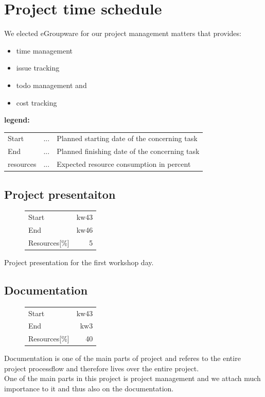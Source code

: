 \section{Project time schedule}

We elected eGroupware for our project management matters that provides:
\begin{itemize}
 \item time management
 \item issue tracking
 \item todo management and
 \item cost tracking
\end{itemize}

\textbf{legend:} \\
\begin{tabular}{lcl}
Start & ... & Planned starting date of the concerning task\\
End   & ... & Planned finishing date of the concerning task\\ 
resources & ... & Expected resource consumption in percent\\
\end{tabular}


\subsection{Project presentaiton}
\begin{figure}
\begin{tabular}[t]{|lr|}
\hline
Start & kw43\\
End & kw46\\
Resources[\%] & 5\\
\hline
\end{tabular}
\end{figure}
Project presentation for the first workshop day.\\

\subsection{Documentation}
\begin{figure}
\begin{tabular}[t]{|lr|}
\hline
Start & kw43\\
End & kw3\\
Resources[\%] & 40\\
\hline
\end{tabular}
\end{figure}
Documentation is one of the main parts of project and referes to the entire project 
processflow and therefore lives over the entire project.\\
One of the main parts in this project is project management and we attach much 
importance to it and thus also on the documentation.\\

